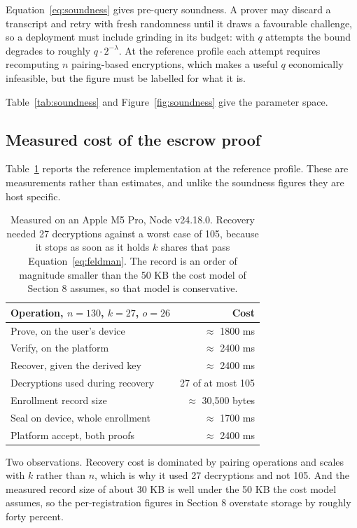 \documentclass[11pt,a4paper]{article}
\begin{document}
Equation~\ref{eq:soundness} gives pre-query soundness. A prover may discard a
transcript and retry with fresh randomness until it draws a favourable challenge,
so a deployment must include grinding in its budget: with $q$ attempts the bound
degrades to roughly $q \cdot 2^{-\lambda}$. At the reference profile each attempt
requires recomputing $n$ pairing-based encryptions, which makes a useful $q$
economically infeasible, but the figure must be labelled for what it is.

Table~\ref{tab:soundness} and Figure~\ref{fig:soundness} give the parameter
space.

\subsection{Measured cost of the escrow proof}

Table~\ref{tab:measured} reports the reference implementation at the reference
profile. These are measurements rather than estimates, and unlike the soundness
figures they are host specific.

\begin{table}[h]
\centering
\begin{tabular}{lr}
\toprule
Operation, $n{=}130$, $k{=}27$, $o{=}26$ & Cost \\
\midrule
Prove, on the user's device            & $\approx$ 1800 ms \\
Verify, on the platform                & $\approx$ 2400 ms \\
Recover, given the derived key         & $\approx$ 2400 ms \\
Decryptions used during recovery       & 27 of at most 105 \\
Enrollment record size                 & $\approx$ 30{,}500 bytes \\
\midrule
Seal on device, whole enrollment       & $\approx$ 1700 ms \\
Platform accept, both proofs           & $\approx$ 2400 ms \\
\bottomrule
\end{tabular}
\caption{Measured on an Apple M5 Pro, Node v24.18.0. Recovery needed 27
decryptions against a worst case of 105, because it stops as soon as it holds
$k$ shares that pass Equation~\ref{eq:feldman}. The record is an order of
magnitude smaller than the 50 KB the cost model of Section 8 assumes, so that
model is conservative.}
\label{tab:measured}
\end{table}

Two observations. Recovery cost is dominated by pairing operations and scales
with $k$ rather than $n$, which is why it used 27 decryptions and not 105. And
the measured record size of about 30 KB is well under the 50 KB the cost model
assumes, so the per-registration figures in Section 8 overstate storage by
roughly forty percent.
\end{document}

